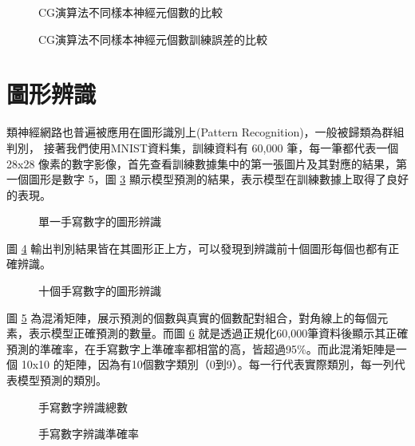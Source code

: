 \documentclass[12pt, a4paper]{article}
\begin{document}
\begin{figure}[H]
    \caption{CG演算法不同樣本神經元個數的比較}
    \label{fig:CG演算法不同樣本神經元個數的比較}
\end{figure}
\begin{figure}[H]
    \caption{CG演算法不同樣本神經元個數訓練誤差的比較}
    \label{fig:CG演算法不同樣本神經元個數訓練誤差的比較}
\end{figure}
\section{圖形辨識}
類神經網路也普遍被應用在圖形識別上(Pattern Recognition)，一般被歸類為群組判別，
接著我們使用MNIST資料集，訓練資料有 60,000 筆，每一筆都代表一個 28x28 像素的數字影像，首先查看訓練數據集中的第一張圖片及其對應的結果，第一個圖形是數字 5，圖 \ref{fig:1手寫數字的圖形辨識} 顯示模型預測的結果，表示模型在訓練數據上取得了良好的表現。
\begin{figure}[H]
    \caption{單一手寫數字的圖形辨識}
    \label{fig:1手寫數字的圖形辨識}
\end{figure}

圖 \ref{fig:10手寫數字的圖形辨識} 輸出判別結果皆在其圖形正上方，可以發現到辨識前十個圖形每個也都有正確辨識。

\begin{figure}[H]
    \caption{十個手寫數字的圖形辨識}
    \label{fig:10手寫數字的圖形辨識}
\end{figure}

圖 \ref{fig:手寫數字辨識數量} 為混淆矩陣，展示預測的個數與真實的個數配對組合，對角線上的每個元素，表示模型正確預測的數量。而圖 \ref{fig:手寫數字辨識準確率} 就是透過正規化60,000筆資料後顯示其正確預測的準確率，在手寫數字上準確率都相當的高，皆超過95\%。而此混淆矩陣是一個 10x10 的矩陣，因為有10個數字類別（0到9）。每一行代表實際類別，每一列代表模型預測的類別。
 
\begin{figure}[H]
    \caption{手寫數字辨識總數}
    \label{fig:手寫數字辨識數量}
\end{figure}
\begin{figure}[H]
    \caption{手寫數字辨識準確率}
    \label{fig:手寫數字辨識準確率}
\end{figure}
\end{document}
